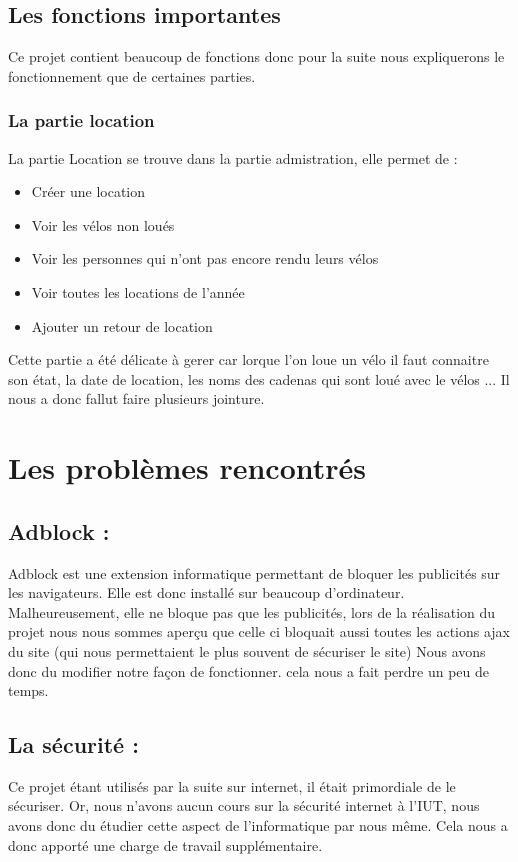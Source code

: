 \documentclass[11pt,a4paper,titlepage]{report}
\begin{document}
\section{Les fonctions importantes}
Ce projet contient beaucoup de fonctions donc pour la suite nous expliquerons le fonctionnement que de certaines parties.  
\subsection{La partie location}
La partie Location se trouve dans la partie admistration, elle permet de : 
\begin{itemize}
\item Créer une location
\item Voir les vélos non loués
\item Voir les personnes qui n'ont pas encore rendu leurs vélos
\item Voir toutes les locations de l'année
\item Ajouter un retour de location 
\end{itemize}

Cette partie a été délicate à gerer car lorque l'on loue un vélo il faut connaitre son état, la date de location, les noms des cadenas qui sont loué avec le vélos ... Il nous a donc fallut faire plusieurs jointure. 
 

\chapter{Les problèmes rencontrés}

\section{Adblock :} 
Adblock est une extension informatique permettant de bloquer les publicités sur les navigateurs. Elle est donc installé sur beaucoup d'ordinateur. 
Malheureusement, elle ne bloque pas que les publicités, lors de la réalisation du projet nous nous sommes aperçu que celle ci bloquait aussi toutes les actions ajax du site (qui nous permettaient le plus souvent de sécuriser le site) 
Nous avons donc du modifier notre façon de fonctionner. cela nous a fait perdre un peu de temps.

\section{La sécurité : }
Ce projet étant utilisés par la suite sur internet, il était primordiale de le sécuriser. Or, nous n'avons aucun cours sur la sécurité internet à l'IUT, nous avons donc du étudier cette aspect de l'informatique par nous même. Cela nous a donc apporté une charge de travail supplémentaire.
\end{document}
